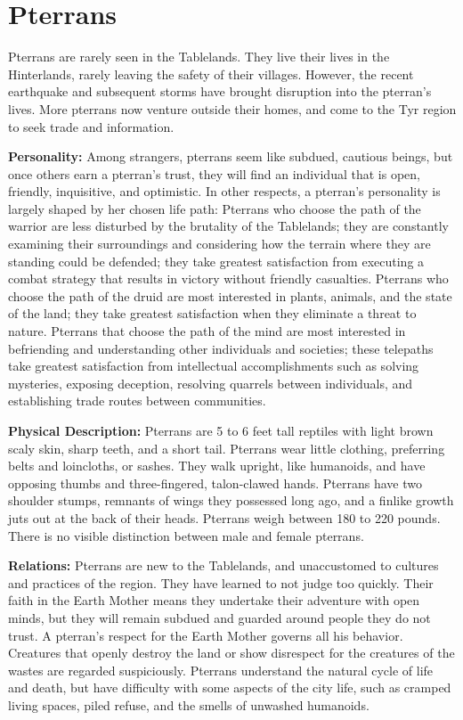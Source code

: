\section{Pterrans}

Pterrans are rarely seen in the Tablelands. They live their lives in the Hinterlands, rarely leaving the safety of their villages. However, the recent earthquake and subsequent storms have brought disruption into the pterran's lives. More pterrans now venture outside their homes, and come to the Tyr region to seek trade and information.

\textbf{Personality:} Among strangers, pterrans seem like subdued, cautious beings, but once others earn a pterran's trust, they will find an individual that is open, friendly, inquisitive, and optimistic. In other respects, a pterran's personality is largely shaped by her chosen life path: Pterrans who choose the path of the warrior are less disturbed by the brutality of the Tablelands; they are constantly examining their surroundings and considering how the terrain where they are standing could be defended; they take greatest satisfaction from executing a combat strategy that results in victory without friendly casualties. Pterrans who choose the path of the druid are most interested in plants, animals, and the state of the land; they take greatest satisfaction when they eliminate a threat to nature. Pterrans that choose the path of the mind are most interested in befriending and understanding other individuals and societies; these telepaths take greatest satisfaction from intellectual accomplishments such as solving mysteries, exposing deception, resolving quarrels between individuals, and establishing trade routes between communities.

\textbf{Physical Description:} Pterrans are 5 to 6 \onehalf feet tall reptiles with light brown scaly skin, sharp teeth, and a short tail. Pterrans wear little clothing, preferring belts and loincloths, or sashes. They walk upright, like humanoids, and have opposing thumbs and three-fingered, talon-clawed hands. Pterrans have two shoulder stumps, remnants of wings they possessed long ago, and a finlike growth juts out at the back of their heads. Pterrans weigh between 180 to 220 pounds. There is no visible distinction between male and female pterrans.

\textbf{Relations:} Pterrans are new to the Tablelands, and unaccustomed to cultures and practices of the region. They have learned to not judge too quickly. Their faith in the Earth Mother means they undertake their adventure with open minds, but they will remain subdued and guarded around people they do not trust. A pterran's respect for the Earth Mother governs all his behavior. Creatures that openly destroy the land or show disrespect for the creatures of the wastes are regarded suspiciously. Pterrans understand the natural cycle of life and death, but have difficulty with some aspects of the city life, such as cramped living spaces, piled refuse, and the smells of unwashed humanoids.

